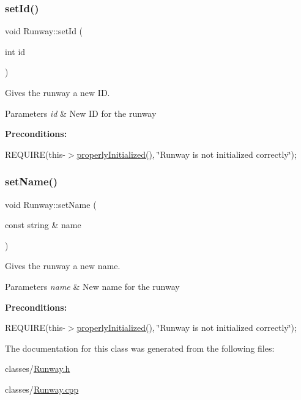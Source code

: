\subsubsection{\texorpdfstring{set\+Id()}{setId()}}
{\footnotesize\ttfamily void Runway\+::set\+Id (\begin{DoxyParamCaption}\item[{int}]{id }\end{DoxyParamCaption})}



Gives the runway a new ID. 


\begin{DoxyParams}{Parameters}
{\em id} & New ID for the runway\\
\hline
\end{DoxyParams}
{\bfseries Preconditions\+:}
\begin{DoxyItemize}
\item R\+E\+Q\+U\+I\+RE(this-\/$>$\mbox{\hyperlink{class_runway_a360d98246cabf3aa929765f81a656348}{properly\+Initialized()}}, \char`\"{}\+Runway is not initialized correctly\char`\"{}); 
\end{DoxyItemize}\mbox{\label{class_runway_ab601d0a69ecffc0042d69cf0eb0cdaba}} 
\subsubsection{\texorpdfstring{set\+Name()}{setName()}}
{\footnotesize\ttfamily void Runway\+::set\+Name (\begin{DoxyParamCaption}\item[{const string \&}]{name }\end{DoxyParamCaption})}



Gives the runway a new name. 


\begin{DoxyParams}{Parameters}
{\em name} & New name for the runway\\
\hline
\end{DoxyParams}
{\bfseries Preconditions\+:}
\begin{DoxyItemize}
\item R\+E\+Q\+U\+I\+RE(this-\/$>$\mbox{\hyperlink{class_runway_a360d98246cabf3aa929765f81a656348}{properly\+Initialized()}}, \char`\"{}\+Runway is not initialized correctly\char`\"{}); 
\end{DoxyItemize}

The documentation for this class was generated from the following files\+:\begin{DoxyCompactItemize}
\item 
classes/\mbox{\hyperlink{_runway_8h}{Runway.\+h}}\item 
classes/\mbox{\hyperlink{_runway_8cpp}{Runway.\+cpp}}\end{DoxyCompactItemize}
